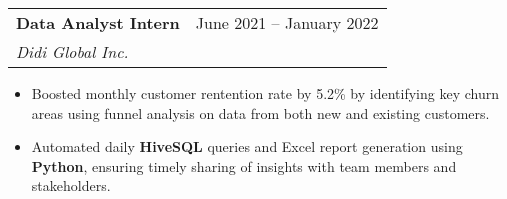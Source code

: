 \documentclass[letterpaper,11pt]{article}
\makeatletter
\newcommand{\resumeItem}[1]{
  \item\small{
    {#1 \vspace{-2pt}}
  }
}
\newcommand{\resumeSubheading}[4]{
  \vspace{-2pt}\item
    \begin{tabular*}{0.97\textwidth}[t]{l@{\extracolsep{\fill}}r}
      \textbf{#1} & #2 \\
      \textit{\small#3} & \textit{\small #4} \\
    \end{tabular*}\vspace{-7pt}
}
\newcommand{\resumeSubSubheading}[2]{
    \item
    \begin{tabular*}{0.97\textwidth}{l@{\extracolsep{\fill}}r}
      \textit{\small#1} & \textit{\small #2} \\
    \end{tabular*}\vspace{-7pt}
}
\newcommand{\resumeSubHeadingListEnd}{\end{itemize}}
\newcommand{\resumeItemListStart}{\begin{itemize}}
\newcommand{\resumeItemListEnd}{\end{itemize}\vspace{-5pt}}
\makeatother
\begin{document}
    \resumeSubheading
      {Data Analyst Intern}{June 2021 -- January 2022}
      {Didi Global Inc.}{}
      \resumeItemListStart

        \resumeItem{Boosted monthly customer rentention rate by 5.2\% by identifying key churn areas using funnel analysis on data from both new and existing customers.}
        \resumeItem{Automated daily \textbf{HiveSQL} queries and Excel report generation using \textbf{Python}, ensuring timely sharing of insights with team members and stakeholders.}
      \resumeItemListEnd
      

\end{document}

